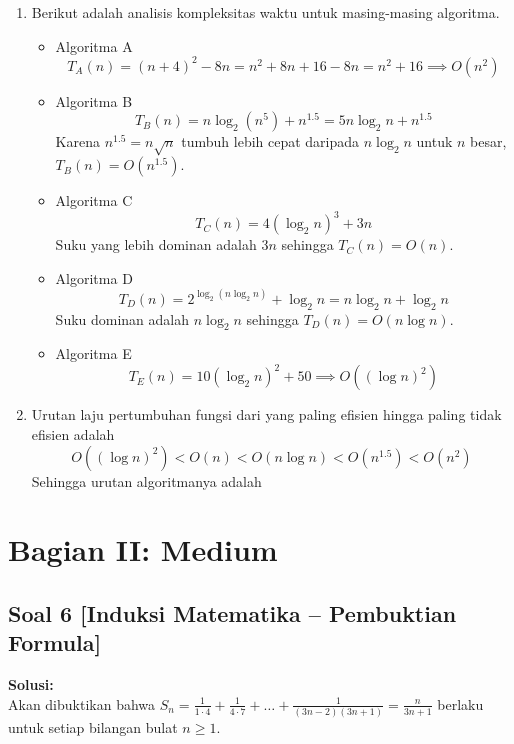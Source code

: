 \documentclass[12pt,a4paper]{article}
\begin{document}
\begin{enumerate}[label=(\alph*)]
    \item Berikut adalah analisis kompleksitas waktu untuk masing-masing algoritma.
    \begin{itemize}
        \item Algoritma A
        \[ T_A(n) = (n + 4)^2 - 8n = n^2 + 8n + 16 - 8n = n^2 + 16 \implies O(n^2) \]
        
        \item Algoritma B
        \[ T_B(n) = n \log_2(n^5) + n^{1.5} = 5n \log_2 n + n^{1.5} \]
        Karena $n^{1.5} = n\sqrt{n}$ tumbuh lebih cepat daripada $n \log_2 n$ untuk $n$ besar, $T_B(n) = O(n^{1.5})$.
        
        \item Algoritma C
        \[ T_C(n) = 4(\log_2 n)^3 + 3n \]
        Suku yang lebih dominan adalah $3n$ sehingga $T_C(n) = O(n)$.
        
        \item Algoritma D
        \[ T_D(n) = 2^{\log_2(n \log_2 n)} + \log_2 n = n \log_2 n + \log_2 n \]
        Suku dominan adalah $n \log_2 n$ sehingga $T_D(n) = O(n \log n)$.
        
        \item Algoritma E
        \[ T_E(n) = 10(\log_2 n)^2 + 50 \implies O((\log n)^2) \]
    \end{itemize}

    \item Urutan laju pertumbuhan fungsi dari yang paling efisien hingga paling tidak efisien adalah
    \[ O((\log n)^2) < O(n) < O(n \log n) < O(n^{1.5}) < O(n^2) \]
    Sehingga urutan algoritmanya adalah 
\end{enumerate}

\newpage
\section*{Bagian II: Medium}

\subsection*{Soal 6 [Induksi Matematika -- Pembuktian Formula]}
\textbf{Solusi:} \\
Akan dibuktikan bahwa $S_n = \frac{1}{1 \cdot 4} + \frac{1}{4 \cdot 7} + \dots + \frac{1}{(3n-2)(3n+1)} = \frac{n}{3n+1}$ berlaku untuk setiap bilangan bulat $n \geq 1$.
\end{document}
